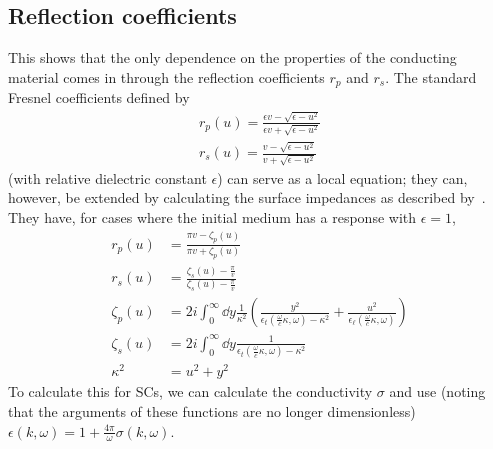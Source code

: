 \documentclass[11pt]{article}
\begin{document}
	\subsection{Reflection coefficients} \label{subsec:ReflectionCoeffs}
	This shows that the only dependence on the properties of the conducting material comes in through the reflection coefficients $r_p$ and $r_s$.
	The standard Fresnel coefficients defined by
	\begin{align}
		r_p(u) = \frac{\epsilon v - \sqrt{\epsilon - u^2}}{\epsilon v + \sqrt{\epsilon - u^2}} \\
		r_s(u) = \frac{v - \sqrt{\epsilon - u^2}}{v + \sqrt{\epsilon - u^2}}
	\end{align}
	(with relative dielectric constant $\epsilon$) can serve as a local equation;
	they can, however, be extended by calculating the surface impedances as described by~\cite{Ford1984}.
	They have, for cases where the initial medium has a response with $\epsilon = 1$,
	\begin{align}
		r_p(u) &= \frac{\pi v - \zeta_p(u)}{\pi v + \zeta_p(u)} \\
		r_s(u) &= \frac{\zeta_s(u) - \frac{\pi}{v}}{\zeta_s(u) - \frac{\pi}{v}} \\
		\zeta_p(u) &= 2i \int_0^\infty \dd{y} \frac{1}{\kappa^2} \left( \frac{y^2}{\epsilon_t(\frac{\omega}{c}\kappa, \omega) - \kappa^2} + \frac{u^2}{\epsilon_\ell(\frac{\omega}{c}\kappa, \omega)} \right) \\
		\zeta_s(u) &= 2i \int_0^\infty \dd{y} \frac{1}{\epsilon_t(\frac{\omega}{c}\kappa, \omega) - \kappa^2} \\
		\kappa^2 &= u^2 + y^2
	\end{align}
	To calculate this for SCs, we can calculate the conductivity $\sigma$ and use (noting that the arguments of these functions are no longer dimensionless) $\epsilon(k, \omega) = 1 + \frac{4 \pi}{\omega} \sigma(k, \omega)$.

	\newpage
	\listoftodos
	\newpage
	\printbibliography
\end{document}
